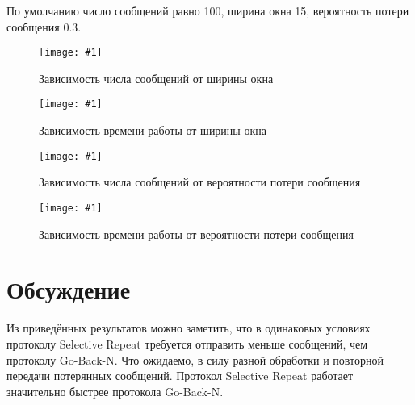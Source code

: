 \documentclass[a4paper,12pt]{article}
\newcommand{\plot}[3]{
    \begin{figure}[H]
        \begin{center}
            \texttt{[image: \#1]}
            \caption{#2}
            \label{#3}
        \end{center}
    \end{figure}
}
\begin{document}
    По умолчанию число сообщений равно 100, ширина окна 15, вероятность потери сообщения 0.3.

    \plot{img/GBN SR num ws.png}{Зависимость числа сообщений от ширины окна}{p:n_ws}

    \plot{img/GBN SR time ws.png}{Зависимость времени работы от ширины окна}{p:t_ws}

    \plot{img/GBN SR num prob.png}{Зависимость числа сообщений от вероятности потери сообщения}{p:n_pr}

    \plot{img/GBN SR time prob.png}{Зависимость времени работы от вероятности потери сообщения}{p:t_pr}

    \section{Обсуждение}
    \quad Из приведённых результатов можно заметить, что в одинаковых условиях протоколу Selective Repeat требуется отправить меньше сообщений, чем протоколу Go-Back-N.
    Что ожидаемо, в силу разной обработки и повторной передачи потерянных сообщений.
    Протокол Selective Repeat работает значительно быстрее протокола Go-Back-N.
\end{document}
